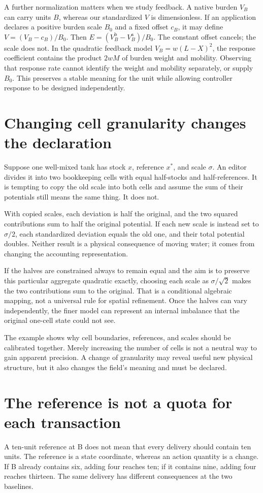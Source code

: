 A further normalization matters when we study feedback. A native burden $V_B$ can carry units $B$, whereas our standardized $V$ is dimensionless. If an application declares a positive burden scale $B_0$ and a fixed offset $c_B$, it may define $V=(V_B-c_B)/B_0$. Then $E=(V_B^{\mathrm b}-V_B^{\mathrm a})/B_0$. The constant offset cancels; the scale does not. In the quadratic feedback model $V_B=w(L-X)^2$, the response coefficient contains the product $2wM$ of burden weight and mobility. Observing that response rate cannot identify the weight and mobility separately, or supply $B_0$. This preserves a stable meaning for the unit while allowing controller response to be designed independently.

\section{Changing cell granularity changes the declaration}
Suppose one well-mixed tank has stock \(x\), reference \(x^*\), and scale \(\sigma\). An editor divides it into two bookkeeping cells with equal half-stocks and half-references. It is tempting to copy the old scale into both cells and assume the sum of their potentials still means the same thing. It does not.

With copied scales, each deviation is half the original, and the two squared contributions sum to half the original potential. If each new scale is instead set to \(\sigma/2\), each standardized deviation equals the old one, and their total potential doubles. Neither result is a physical consequence of moving water; it comes from changing the accounting representation.

If the halves are constrained always to remain equal and the aim is to preserve this particular aggregate quadratic exactly, choosing each scale as \(\sigma/\sqrt{2}\) makes the two contributions sum to the original. That is a conditional algebraic mapping, not a universal rule for spatial refinement. Once the halves can vary independently, the finer model can represent an internal imbalance that the original one-cell state could not see.

The example shows why cell boundaries, references, and scales should be calibrated together. Merely increasing the number of cells is not a neutral way to gain apparent precision. A change of granularity may reveal useful new physical structure, but it also changes the field's meaning and must be declared.

\section{The reference is not a quota for each transaction}
A ten-unit reference at B does not mean that every delivery should contain ten units. The reference is a state coordinate, whereas an action quantity is a change. If B already contains six, adding four reaches ten; if it contains nine, adding four reaches thirteen. The same delivery has different consequences at the two baselines.


